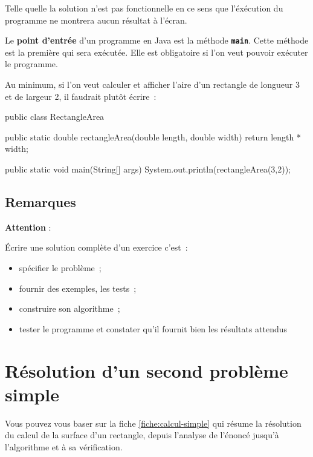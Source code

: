 			Telle quelle la solution n'est pas fonctionnelle en ce sens que 
			l'éxécution du programme ne montrera aucun résultat à l'écran. 
			
			Le \textbf{point d'entrée} d'un programme en
			Java est la méthode \textbf{\texttt{main}}. Cette méthode est la
			première qui sera exécutée. Elle est obligatoire si l'on veut pouvoir
			exécuter le programme. 

			Au minimum, si l'on veut calculer et afficher l'aire d'un rectangle
			de longueur 3 et de largeur 2, il faudrait plutôt écrire~:

			\begin{java}
public class RectangleArea{
	public static double rectangleArea(double length, double width){
		return length * width;
	}

	public static void main(String[] args){
		System.out.println(rectangleArea(3,2));
	}
}
			\end{java}

		\subsection{Remarques}
			\textbf{Attention} : 
	
			Écrire une solution complète d'un exercice c'est~:
			\begin{itemize}
				\item spécifier le problème~;
				\item fournir des exemples, les tests~;
				\item construire son algorithme~;
				\item tester le programme et constater qu'il fournit bien les 
					résultats attendus
			\end{itemize}


		\clearpage
		\section{Résolution d'un second problème simple}
		\label{prem-ex-simple}

			
			Vous pouvez vous baser sur la fiche \vref{fiche:calcul-simple} qui
			résume la résolution du calcul de la surface d’un rectangle, depuis
			l’analyse de l’énoncé jusqu’à l’algorithme et à sa vérification.
	
